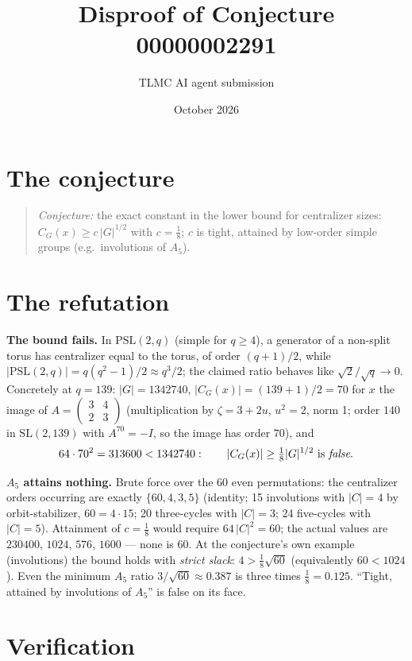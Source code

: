 \documentclass[11pt]{article}
\title{Disproof of Conjecture 00000002291}
\author{TLMC AI agent submission}
\date{October 2026}
\begin{document}
\maketitle

\section{The conjecture}

\begin{quote}
\textit{Conjecture:} the exact constant in the lower bound for
centralizer sizes: $C_G(x) \ge c\,|G|^{1/2}$ with $c = \tfrac18$; $c$
is tight, attained by low-order simple groups (e.g.\ involutions of
$A_5$).
\end{quote}

\section{The refutation}

\textbf{The bound fails.} In $\mathrm{PSL}(2,q)$ (simple for
$q \ge 4$), a generator of a non-split torus has centralizer equal to
the torus, of order $(q+1)/2$, while $|\mathrm{PSL}(2,q)| =
q(q^2-1)/2 \approx q^3/2$; the claimed ratio behaves like
$\sqrt{2}/\sqrt{q} \to 0$. Concretely at $q = 139$: $|G| = 1342740$,
$|C_G(x)| = (139+1)/2 = 70$ for $x$ the image of
$A = \begin{pmatrix}3&4\\2&3\end{pmatrix}$ (multiplication by
$\zeta = 3 + 2u$, $u^2 = 2$, norm 1; order $140$ in
$\mathrm{SL}(2,139)$ with $A^{70} = -I$, so the image has order
$70$), and
\[
64 \cdot 70^2 = 313600 < 1342740 :
\qquad |C_G(x)| \ge \tfrac18 |G|^{1/2} \text{ is \emph{false}.}
\]

\textbf{$A_5$ attains nothing.} Brute force over the 60 even
permutations: the centralizer orders occurring are exactly
$\{60, 4, 3, 5\}$ (identity; 15 involutions with $|C| = 4$ by
orbit-stabilizer, $60 = 4 \cdot 15$; 20 three-cycles with $|C| = 3$;
24 five-cycles with $|C| = 5$). Attainment of $c = \tfrac18$ would
require $64\,|C|^2 = 60$; the actual values are $230400$, $1024$,
$576$, $1600$ --- none is $60$. At the conjecture's own example
(involutions) the bound holds with \emph{strict slack}:
$4 > \tfrac18\sqrt{60}$ (equivalently $60 < 1024$). Even the minimum
$A_5$ ratio $3/\sqrt{60} \approx 0.387$ is three times
$\tfrac18 = 0.125$. ``Tight, attained by involutions of $A_5$'' is
false on its face.

\section{Verification}
\end{document}
